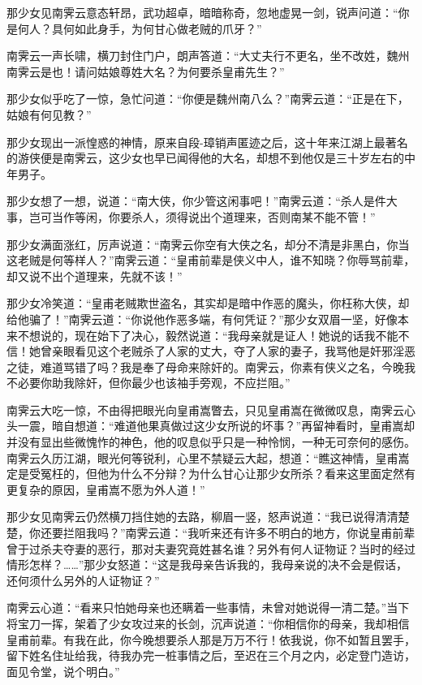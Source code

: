 \documentclass[12pt,oneside]{book}
\begin{document}
那少女见南霁云意态轩昂，武功超卓，暗暗称奇，忽地虚晃一剑，锐声问道：``你是何人？具何如此身手，为何甘心做老贼的爪牙？''

南霁云一声长啸，横刀封住门户，朗声答道：``大丈夫行不更名，坐不改姓，魏州南霁云是也！请问姑娘尊姓大名？为何要杀皇甫先生？''

那少女似乎吃了一惊，急忙问道：``你便是魏州南八么？''南霁云道：``正是在下，姑娘有何见教？''

那少女现出一派惶惑的神情，原来自段-璋销声匿迹之后，这十年来江湖上最著名的游侠便是南霁云，这少女也早已闻得他的大名，却想不到他仅是三十岁左右的中年男子。

那少女想了一想，说道：``南大侠，你少管这闲事吧！''南霁云道：``杀人是件大事，岂可当作等闲，你要杀人，须得说出个道理来，否则南某不能不管！''

那少女满面涨红，厉声说道：``南霁云你空有大侠之名，却分不清是非黑白，你当这老贼是何等样人？''南霁云道：``皇甫前辈是侠义中人，谁不知晓？你辱骂前辈，却又说不出个道理来，先就不该！''

那少女冷笑道：``皇甫老贼欺世盗名，其实却是暗中作恶的魔头，你枉称大侠，却给他骗了！''南霁云道：``你说他作恶多端，有何凭证？''那少女双眉一坚，好像本来不想说的，现在始下了决心，毅然说道：``我母亲就是证人！她说的话我不能不信！她曾亲眼看见这个老贼杀了人家的丈大，夺了人家的妻子，我骂他是奸邪淫恶之徒，难道骂错了吗？我是奉了母命来除奸的。南霁云，你素有侠义之名，今晚我不必要你助我除奸，但你最少也该袖手旁观，不应拦阻。''

南霁云大吃一惊，不由得把眼光向皇甫嵩瞥去，只见皇甫嵩在微微叹息，南霁云心头一震，暗自想道：``难道他果真做过这少女所说的坏事？''再留神看时，皇甫嵩却并没有显出些微愧怍的神色，他的叹息似乎只是一种怜悯，一种无可奈何的感伤。南霁云久历江湖，眼光何等锐利，心里不禁疑云大起，想道：``瞧这神情，皇甫嵩定是受冤枉的，但他为什么不分辩？为什么甘心让那少女所杀？看来这里面定然有更复杂的原因，皇甫嵩不愿为外人道！''

那少女见南霁云仍然横刀挡住她的去路，柳眉一竖，怒声说道：``我已说得清清楚楚，你还要拦阻我吗？''南霁云道：``我听来还有许多不明白的地方，你说皇甫前辈曾于过杀夫夺妻的恶行，那对夫妻究竟姓甚名谁？另外有何人证物证？当时的经过情形怎样？\ldots\ldots{}''那少女怒道：``这是我母亲告诉我的，我母亲说的决不会是假话，还何须什么另外的人证物证？''

南霁云心道：``看来只怕她母亲也还瞒着一些事情，未曾对她说得一清二楚。''当下将宝刀一挥，架着了少女攻过来的长剑，沉声说道：``你相信你的母亲，我却相信皇甫前辈。有我在此，你今晚想要杀人那是万万不行！依我说，你不如暂且罢手，留下姓名住址给我，待我办完一桩事情之后，至迟在三个月之内，必定登门造访，面见令堂，说个明白。''
\end{document}
